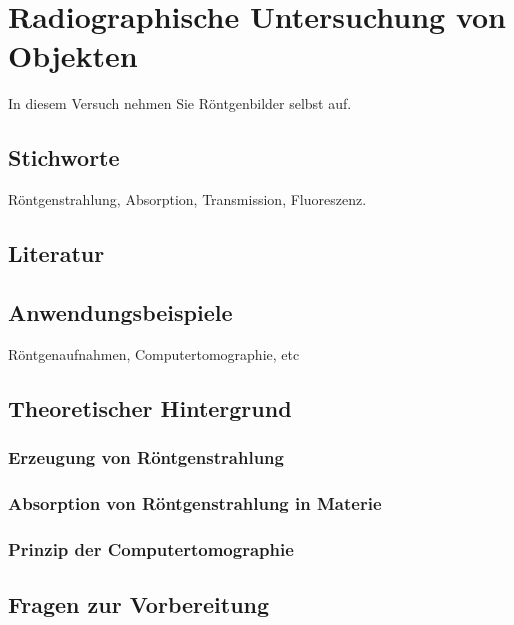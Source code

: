 \chapter{Radiographische Untersuchung von Objekten}
\label{vn:roentgen-1}

In diesem Versuch nehmen Sie Röntgenbilder selbst auf.
%
\section{Stichworte}
Röntgenstrahlung, Absorption, Transmission, Fluoreszenz.
%
\section{Literatur}
%
\section{Anwendungsbeispiele}
%
Röntgenaufnahmen, Computertomographie, etc
%
\section{Theoretischer Hintergrund}

\subsection{Erzeugung von Röntgenstrahlung}

\subsection{Absorption von Röntgenstrahlung in Materie}

\subsection{Prinzip der Computertomographie}
\section{Fragen zur Vorbereitung}

